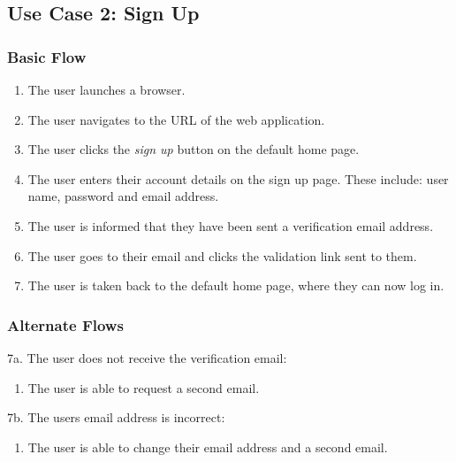 \documentclass[12pt,onecolumn]{article}
\begin{document}
	\subsection{Use Case 2: Sign Up}

		\subsubsection{Basic Flow}

		\begin{enumerate}
			\item The user launches a browser.

			\item The user navigates to the URL of the web application.

			\item The user clicks the \emph{sign up} button on the default home page.

			\item The user enters their account details on the sign up page. These include: user name, password and email address.

			\item The user is informed that they have been sent a verification email address.

			\item The user goes to their email and clicks the validation link sent to them.

			\item The user is taken back to the default home page, where they can now log in.

		\end{enumerate}

		\subsubsection{Alternate Flows}

		7a. The user does not receive the verification email:

		\begin{enumerate}
			\item The user is able to request a second email.
		\end{enumerate}

		7b. The users email address is incorrect:

		\begin{enumerate}
			\item The user is able to change their email address and a second email.
		\end{enumerate}
	
\end{document}
